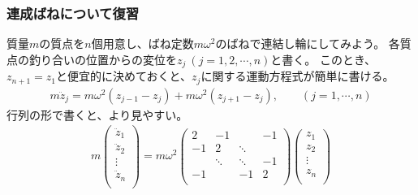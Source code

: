 \documentclass[10pt,a4paper]{jarticle}
\begin{document}
\subsubsection{連成ばねについて復習}
質量$m$の質点を$n$個用意し、ばね定数$m\omega^2$のばねで連結し輪にしてみよう。
各質点の釣り合いの位置からの変位を$z_j~(j=1,2,\cdots,n)$と書く。
このとき、$z_{n+1} = z_1$と便宜的に決めておくと、$z_j$に関する運動方程式が簡単に書ける。
\begin{align}
m \ddot z_j = m \omega^2 (z_{j-1} - z_j) + m \omega^2 (z_{j+1} - z_j),\qquad(j=1,\cdots, n) \label{eq:EOM connected HO}
\end{align}
行列の形で書くと、より見やすい。
\begin{align}
m \left(\begin{array}{c}
\ddot z_1 \\
\ddot z_2 \\
\vdots \\
\ddot z_n \\
\end{array}\right)
%
=
m \omega^2 \left(\begin{array}{cccc}
2  & -1 &        & -1 \\
-1 & 2  & \ddots & \\
   & \ddots & \ddots & -1 \\
-1 &    &    -1  & 2 \\
\end{array}\right)
\left(\begin{array}{c}
z_1 \\
z_2 \\
\vdots \\
z_n \\
\end{array}\right)
\end{align}
\end{document}
